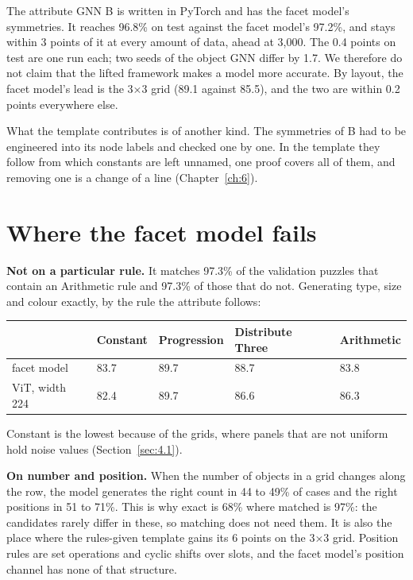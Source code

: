The attribute GNN B is written in PyTorch and has the facet model's symmetries. It reaches 96.8\% on test against the facet model's 97.2\%, and stays within 3 points of it at every amount of data, ahead at 3,000. The 0.4 points on test are one run each; two seeds of the object GNN differ by 1.7. We therefore do not claim that the lifted framework makes a model more accurate. By layout, the facet model's lead is the 3×3 grid (89.1 against 85.5), and the two are within 0.2 points everywhere else.

What the template contributes is of another kind. The symmetries of B had to be engineered into its node labels and checked one by one. In the template they follow from which constants are left unnamed, one proof covers all of them, and removing one is a change of a line (Chapter~\ref{ch:6}).

\section{Where the facet model fails}\label{sec:5.6}

\textbf{Not on a particular rule.} It matches 97.3\% of the validation puzzles that contain an Arithmetic rule and 97.3\% of those that do not. Generating type, size and colour exactly, by the rule the attribute follows:

\begin{center}\small
\begin{tabular}{@{}lllll@{}}
\toprule
 & Constant & Progression & Distribute Three & Arithmetic \\
\midrule
facet model & 83.7 & 89.7 & 88.7 & 83.8 \\
ViT, width 224 & 82.4 & 89.7 & 86.6 & 86.3 \\
\bottomrule
\end{tabular}
\end{center}

Constant is the lowest because of the grids, where panels that are not uniform hold noise values (Section~\ref{sec:4.1}).

\textbf{On number and position.} When the number of objects in a grid changes along the row, the model generates the right count in 44 to 49\% of cases and the right positions in 51 to 71\%. This is why exact is 68\% where matched is 97\%: the candidates rarely differ in these, so matching does not need them. It is also the place where the rules-given template gains its 6 points on the 3×3 grid. Position rules are set operations and cyclic shifts over slots, and the facet model's position channel has none of that structure.

